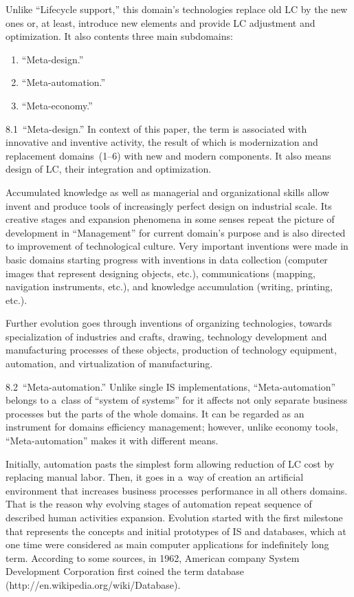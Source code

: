 \begin{multicols}{2}
 Unlike ``Lifecycle support,'' this domain's technologies replace old LC
 by the new ones or, at least, introduce
new elements and provide LC adjustment and optimization. It also contents three main subdomains:
 \begin{enumerate}[{8}.1]
 \item ``Meta-design.''
 \item ``Meta-automation.''
 \item ``Meta-economy.''
 \end{enumerate}

 8.1\ ``Meta-design.'' In context of this paper, the term is associated with innovative and inventive activity,
the result of which is modernization and replacement domains~(1--6) with new and modern components. It
also means design of LC, their integration and optimization.

 Accumulated knowledge as well as managerial and organizational skills allow invent and produce tools
of increasingly perfect design on industrial scale. Its creative stages and expansion phenomena in some
senses repeat the picture of development in ``Management'' for current domain's
purpose and is also directed to
improvement of technological culture. Very important inventions were made in basic domains starting
progress with inventions in data collection (computer images that represent designing objects, etc.),
communications (mapping, navigation instruments, etc.),
and knowledge accumulation (writing, printing, etc.).

 Further evolution goes through inventions of organizing technologies, towards specialization of industries
and crafts, drawing, technology development and manufacturing processes of these objects, production of
technology equipment, automation, and virtualization of manufacturing.

 8.2\ ``Meta-automation.'' Unlike single IS implementations, ``Meta-automation'' belongs
to a~class of ``system of systems'' for it affects not only separate business processes but
the parts of the whole
domains. It can be regarded as an instrument for domains efficiency management; however, unlike
economy tools, ``Meta-automation'' makes it with different means.

Initially, automation pasts the simplest form allowing reduction of LC cost by replacing manual labor. Then, it
goes in a~way of creation an artificial environment that increases business processes performance in all
others domains. That is the reason why evolving stages of automation repeat sequence of described human
activities expansion. Evolution started with the first milestone that represents the concepts and initial
prototypes of IS and databases, which at one time were considered as main computer
applications for indefinitely long term. According to some sources, in 1962, American company System
Development Corporation first coined the term database ({\sf http://en.wikipedia.org/wiki/Database}).


\end{multicols}
